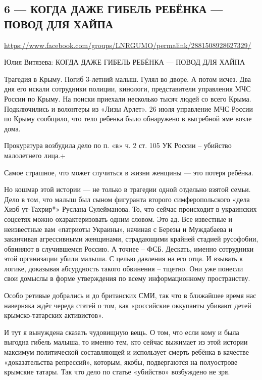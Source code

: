  
 
  
\clearpage
\subsection{6 --- КОГДА ДАЖЕ ГИБЕЛЬ РЕБЁНКА --- ПОВОД ДЛЯ ХАЙПА}
\url{https://www.facebook.com/groups/LNRGUMO/permalink/2881508928627329/}

Юлия Витязева:
КОГДА ДАЖЕ ГИБЕЛЬ РЕБЁНКА --- ПОВОД ДЛЯ ХАЙПА

Трагедия в Крыму.  Погиб 3-летний малыш.  Гулял во дворе. А потом исчез.  Два
дня его искали сотрудники полиции, кинологи, представители управления МЧС
России по Крыму. На поиски приехали несколько тысяч людей со всего Крыма.
Подключились и волонтеры из «Лизы Арлет».  26 июля управление МЧС России по
Крыму сообщило, что тело ребенка было обнаружено в выгребной яме возле дома.

Прокуратура возбудила дело по п. «в» ч. 2 ст. 105 УК России – убийство
малолетнего лица.+

Самое страшное, что может случиться в жизни женщины — это потеря ребёнка.

Но кошмар этой истории — не только в трагедии одной отдельно взятой семьи. Дело
в том, что малыш был сыном фигуранта второго симферопольского «дела Хизб
ут-Тахрир*» Руслана Сулейманова.  То, что сейчас происходит в украинских
соцсетях можно охарактеризовать одним словом.  Это ад.  Все известные и
неизвестные вам «патриоты Украины», начиная с Березы и Муждабаева и заканчивая
агрессивными женщинами, страдающими крайней стадией русофобии, обвиняют в
случившемся Россию.  А точнее – ФСБ.  Дескать, именно сотрудники этой
организации убили малыша.  С целью давления на его отца.  И взывать к логике,
доказывая абсурдность такого обвинения – тщетно.  Они уже понесли свои домыслы
в форме утверждения по всему информационному пространству.

Особо ретивые добрались и до британских СМИ, так что в ближайшее время нас
наверняка ждёт череда статей о том, как «российские оккупанты убивают детей
крымско-татарских активистов».

И тут я вынуждена сказать чудовищную вещь.  О том, что если кому и была выгодна
гибель малыша, то именно тем, кто сейчас выжимает из этой истории максимум
политической составляющей и использует смерть ребёнка в качестве
«доказательства репрессий», которым, якобы, подвергаются на полуострове
крымские татары.  Так что дело по статье «убийство» возбуждено не зря.

